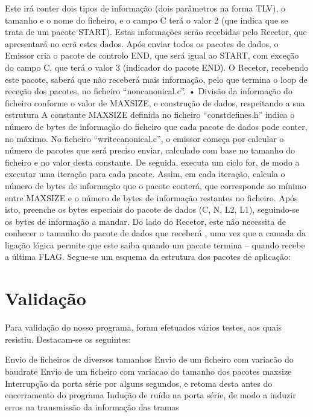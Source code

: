 \documentclass[article, a4paper, 11pt, oneside]{memoir}
\begin{document}
Este irá conter dois tipos de informação (dois parâmetros na forma TLV), o tamanho e o nome do ficheiro, e o campo C terá o valor 2 (que indica que se trata de um pacote START). Estas informações serão recebidas pelo Recetor, que apresentará no ecrã estes dados.
Após enviar todos os pacotes de dados, o Emissor cria o pacote de controlo END, que será igual ao START, com exceção do campo C, que terá o valor 3 (indicador do pacote END). O Recetor, recebendo este pacote, saberá que não receberá mais informação, pelo que termina o loop de receção dos pacotes, no ficheiro “noncanonical.c”.
•	Divisão da informação do ficheiro conforme o valor de MAXSIZE, e construção de dados, respeitando a sua estrutura
A constante MAXSIZE definida no ficheiro “constdefines.h” indica o número de bytes de informação do ficheiro que cada pacote de dados pode conter, no máximo. No ficheiro “writecanonical.c”, o emissor começa por calcular o número de pacotes que será preciso enviar, calculado com base no tamanho do ficheiro e no valor desta constante. De seguida, executa um ciclo for, de modo a executar uma iteração para cada pacote. Assim, em cada iteração, calcula o número de bytes de informação que o pacote conterá, que corresponde ao mínimo entre MAXSIZE e o número de bytes de informação restantes no ficheiro. Após isto, preenche os bytes especiais do pacote de dados (C, N, L2, L1), seguindo-se os bytes de informação a mandar. Do lado do Recetor, este não necessita de conhecer o tamanho do pacote de dados que receberá , uma vez que a camada da ligação lógica permite que este saiba quando um pacote termina – quando recebe a última FLAG. Segue-se um esquema da estrutura dos pacotes de aplicação:

\newpage
\chapter[Validação][Validação]{Validação} \label{\thechapter}

Para validação do nosso programa, foram efetuados vários testes, aos quais resistiu. Destacam-se os seguintes:

Envio de ficheiros de diversos tamanhos
Envio de um ficheiro com variacão do baudrate
Envio de um ficheiro com variacao do tamanho dos pacotes maxsize
Interrupção da porta série por alguns segundos, e retoma desta antes do encerramento do programa
Indução de ruído na porta série, de modo a induzir erros na transmissão da informação das tramas
\end{document}
